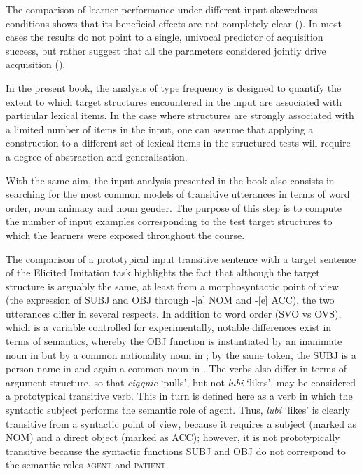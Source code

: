 The comparison of learner performance under different input skewedness conditions shows that its beneficial effects are not completely clear (\citealt{BorovskyElman2006, CasenhiserGoldberg2005}). In most cases the results do not point to a single, univocal predictor of acquisition success, but rather suggest that all the parameters considered jointly drive acquisition (\citealt{YearGordon2009, WulffEtAl2009}).

In the present book, the analysis of type frequency is designed to quantify the extent to which target structures encountered in the input are associated with particular lexical items. In the case where structures are strongly associated with a limited number of items in the input, one can assume that applying a construction to a different set of lexical items in the structured tests will require a degree of abstraction and generalisation. 

With the same aim, the input analysis presented in the book also consists in searching for the most common models of transitive utterances in terms of word order, noun animacy and noun gender. The purpose of this step is to compute the number of input examples corresponding to the test target structures to which the learners were exposed throughout the course. 

The comparison of a prototypical input transitive sentence  with a target sentence of the Elicited Imitation task  highlights the fact that although the target structure is arguably the same, at least from a morphosyntactic point of view (the expression of SUBJ and OBJ through -[a] NOM and -[e] ACC), the two utterances differ in several respects. In addition to word order (SVO vs OVS), which is a variable controlled for experimentally, notable differences exist in terms of semantics, whereby the OBJ function is instantiated by an inanimate noun in  but by a common nationality noun in ; by the same token, the SUBJ is a person name in  and again a common noun in . The verbs also differ in terms of argument structure, so that \textit{ciągnie} ‘pulls’, but not \textit{lubi} ‘likes’, may be considered a prototypical transitive verb. This in turn is defined here as a verb in which the syntactic subject performs the semantic role of agent. Thus, \textit{lubi} ‘likes’ is clearly transitive from a syntactic point of view, because it requires a subject (marked as NOM) and a direct object (marked as ACC); however, it is not prototypically transitive because the syntactic functions SUBJ and OBJ do not correspond to the semantic roles \textsc{agent} and \textsc{patient}.

